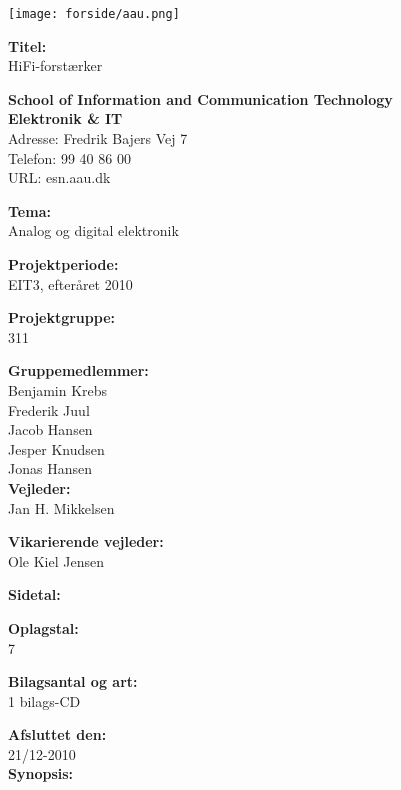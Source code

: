 \begin{multicols}{2}
\texttt{[image: forside/aau.png]}

\small{\textbf{Titel:\\}
HiFi-forstærker}

\scriptsize{\textbf{School of Information and Communication Technology\\ Elektronik \& IT\\}
Adresse: Fredrik Bajers Vej 7\\
Telefon: 99 40 86 00\\
URL: esn.aau.dk \\}
\end{multicols}
\begin{multicols}{2}

\small{\textbf{Tema:\\}
Analog og digital elektronik

\textbf{Projektperiode:\\}
EIT3, efteråret 2010

\textbf{Projektgruppe:\\}
311

\textbf{Gruppemedlemmer:\\}
Benjamin Krebs\\
Frederik Juul\\
Jacob Hansen\\
Jesper Knudsen\\
Jonas Hansen\\

\textbf{Vejleder:\\}
Jan H. Mikkelsen

\textbf{Vikarierende vejleder:\\}
Ole Kiel Jensen

\textbf{Sidetal:\\}
\pageref{LastPage}

\textbf{Oplagstal:\\}
7

\textbf{Bilagsantal og art:\\}
1 bilags-CD

\textbf{Afsluttet den:\\}
21/12-2010
\\
\textbf{Synopsis:}
}

\end{multicols}
